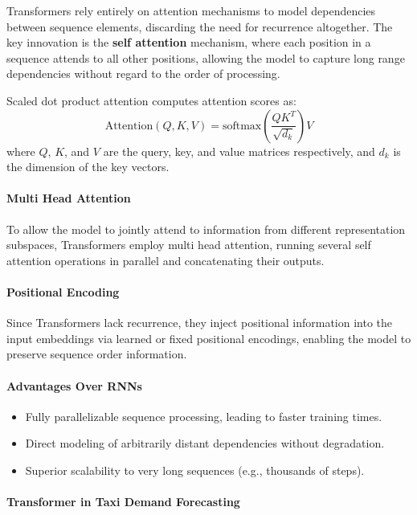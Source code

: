 \documentclass{article}
\begin{document}
Transformers rely entirely on attention mechanisms to model dependencies between sequence elements, discarding the need for recurrence altogether. The key innovation is the \textbf{self attention} mechanism, where each position in a sequence attends to all other positions, allowing the model to capture long range dependencies without regard to the order of processing.

Scaled dot product attention computes attention scores as:
\[
\text{Attention}(Q, K, V) = \text{softmax}\left( \frac{QK^T}{\sqrt{d_k}} \right) V
\]
where \(Q\), \(K\), and \(V\) are the query, key, and value matrices respectively, and \(d_k\) is the dimension of the key vectors.

\paragraph{Multi Head Attention}

To allow the model to jointly attend to information from different representation subspaces, Transformers employ multi head attention, running several self attention operations in parallel and concatenating their outputs.

\paragraph{Positional Encoding}

Since Transformers lack recurrence, they inject positional information into the input embeddings via learned or fixed positional encodings, enabling the model to preserve sequence order information.

\paragraph{Advantages Over RNNs}

\begin{itemize}
    \item Fully parallelizable sequence processing, leading to faster training times.
    \item Direct modeling of arbitrarily distant dependencies without degradation.
    \item Superior scalability to very long sequences (e.g., thousands of steps).
\end{itemize}

\paragraph{Transformer in Taxi Demand Forecasting}
\end{document}
